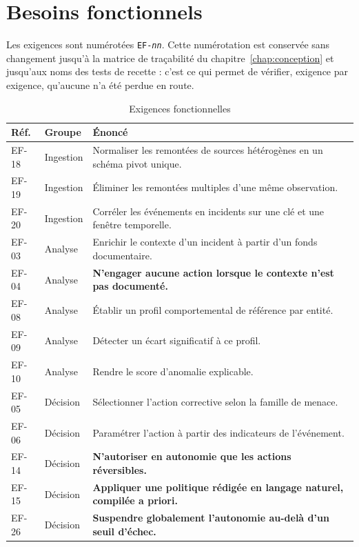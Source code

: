 \section{Besoins fonctionnels}
\label{sec:besoins-fonctionnels}
Les exigences sont num\'erot\'ees \texttt{EF-\textit{nn}}. Cette num\'erotation est
conserv\'ee sans changement jusqu'\`a la matrice de tra\c cabilit\'e du
chapitre~\ref{chap:conception} et jusqu'aux noms des tests de recette : c'est ce
qui permet de v\'erifier, exigence par exigence, qu'aucune n'a \'et\'e perdue en route.

\begin{table}[H]
\centering
\caption{Exigences fonctionnelles}
\label{tab:exigences-fonctionnelles}
\scriptsize
\begin{tabular}{@{}llp{9.2cm}@{}}
\toprule
\textbf{R\'ef.} & \textbf{Groupe} & \textbf{\'Enonc\'e} \\
\midrule
EF-18 & Ingestion & Normaliser les remont\'ees de sources h\'et\'erog\`enes en un sch\'ema pivot unique. \\
EF-19 & Ingestion & \'Eliminer les remont\'ees multiples d'une m\^eme observation. \\
EF-20 & Ingestion & Corr\'eler les \'ev\'enements en incidents sur une cl\'e et une fen\^etre temporelle. \\
\addlinespace
EF-03 & Analyse & Enrichir le contexte d'un incident \`a partir d'un fonds documentaire. \\
EF-04 & Analyse & \textbf{N'engager aucune action lorsque le contexte n'est pas document\'e.} \\
EF-08 & Analyse & \'Etablir un profil comportemental de r\'ef\'erence par entit\'e. \\
EF-09 & Analyse & D\'etecter un \'ecart significatif \`a ce profil. \\
EF-10 & Analyse & Rendre le score d'anomalie explicable. \\
\addlinespace
EF-05 & D\'ecision & S\'electionner l'action corrective selon la famille de menace. \\
EF-06 & D\'ecision & Param\'etrer l'action \`a partir des indicateurs de l'\'ev\'enement. \\
EF-14 & D\'ecision & \textbf{N'autoriser en autonomie que les actions r\'eversibles.} \\
EF-15 & D\'ecision & \textbf{Appliquer une politique r\'edig\'ee en langage naturel, compil\'ee a priori.} \\
EF-26 & D\'ecision & \textbf{Suspendre globalement l'autonomie au-del\`a d'un seuil d'\'echec.} \\

\end{tabular}
\end{table}
